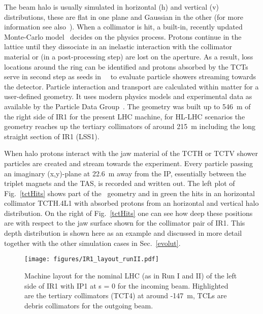 The beam halo is usually simulated in horizontal (h) and vertical (v) distributions, these are flat in one plane and Gaussian in the other (for more information see also~\cite{chiarasThesis}). When a collimator is hit, a built-in, recently updated Monte-Carlo model~\cite{claudiasThesis} decides on the physics process. Protons continue in the lattice until they dissociate in an inelastic interaction with the collimator material or (in a post-processing step) are lost on the aperture. As a result, loss locations around the ring can be identified and protons absorbed by the TCTs serve in second step as seeds in \fluka~\cite{flukaRef1,flukaRef2}~to evaluate particle showers streaming towards the detector. Particle interaction and transport are calculated within matter for a user-defined geometry. It uses modern physics models and experimental data as available by the Particle Data Group~\cite{pdgRef}. The geometry was built up to 546~m of the right side of IR1 for the present LHC machine, for HL-LHC scenarios the geometry reaches up the tertiary collimators of around 215~m including the long straight section of IR1 (LSS1).

When halo protons interact with the jaw material of the TCTH or TCTV shower particles are created and stream towards the experiment. Every particle passing an imaginary (x,y)-plane at 22.6~m away from the IP, essentially between the triplet magnets and the TAS, is recorded and written out. The left plot of Fig.~\ref{tctHits} shows part of the \fluka~geometry and in green the hits in an horizontal collimator TCTH.4L1 with absorbed protons from an horizontal and vertical halo distribution. On the right of Fig.~\ref{tctHits} one can see how deep these positions are with respect to the jaw surface shown for the collimator pair of IR1. This depth distribution is shown here as an example and discussed in more detail together with the other simulation cases in Sec.~\ref{evolut}.

\begin{figure}%
\begin{center}
\texttt{[image: figures/IR1\_layout\_runII.pdf]}
\end{center}
\vspace{-0.6cm}
 \caption{Machine layout for the nominal LHC (as in Run I and II) of the left side of IR1 with IP1 at s = 0 for the incoming beam. Highlighted are the tertiary collimators (TCT4) at around -147~m, TCLs are debris collimators for the outgoing beam.
  \label{nominalLHC_layout}}
\end{figure}


